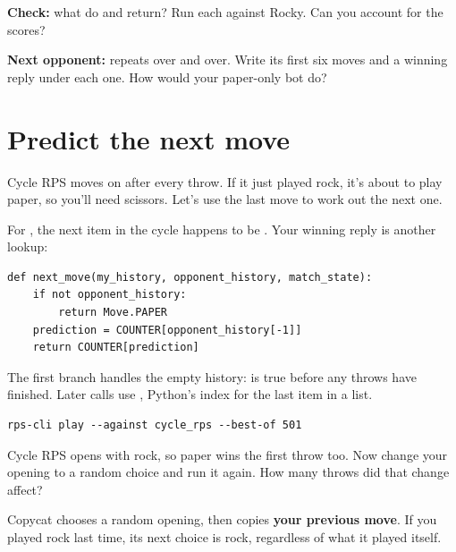 \documentclass[11pt]{article}
\begin{document}
\begin{checkpoint}
\textbf{Check:} what do  and  return? Run each against Rocky. Can you account for the scores?
\end{checkpoint}

\textbf{Next opponent:}  repeats  over and over. Write its first six moves and a winning reply under each one. How would your paper-only bot do?
\par
\clearpage
\section*{Predict the next move}

\begin{context}
Cycle RPS moves on after every throw. If it just played rock, it's about to play paper, so you'll need scissors. Let's use the last move to work out the next one.

\end{context}


For , the next item in the cycle happens to be . Your winning reply is another lookup:


\begin{lstlisting}[style=python]
def next_move(my_history, opponent_history, match_state):
    if not opponent_history:
        return Move.PAPER
    prediction = COUNTER[opponent_history[-1]]
    return COUNTER[prediction]
\end{lstlisting}

The first branch handles the empty history:  is true before any throws have finished. Later calls use \code{[-1]}, Python's index for the last item in a list.


\begin{lstlisting}[style=shell,numbers=none,xleftmargin=4pt,framexleftmargin=0pt]
rps-cli play --against cycle_rps --best-of 501
\end{lstlisting}

Cycle RPS opens with rock, so paper wins the first throw too. Now change your opening to a random choice and run it again. How many throws did that change affect?



Copycat chooses a random opening, then copies \textbf{your previous move}. If you played rock last time, its next choice is rock, regardless of what it played itself.
\end{document}
